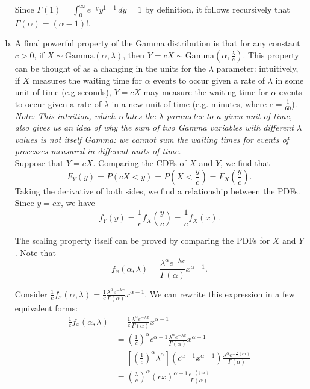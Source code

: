 \begin{enumerate}[a)]
    Since $\Gamma(1) = \int_0^{\infty} e^{-y} y^{1 - 1} \, dy = 1$ by definition, it follows recursively that $\Gamma(\alpha) = (\alpha - 1)!$.

    \item A final powerful property of the Gamma distribution is that for any constant $c > 0$, if $X \sim \mathrm{Gamma}(\alpha, \lambda)$, then
    $Y = cX \sim \mathrm{Gamma}\left(\alpha, \frac{\lambda}{c}\right)$. This property can be thought of as a changing in the units for the $\lambda$ parameter:
    intuitively, if $X$ measures the waiting time for $\alpha$ events to occur given a rate of $\lambda$ in some unit of time (e.g seconds), $Y=cX$ 
    may measure the waiting time for $\alpha$ events to occur given a rate of $\lambda$ in a new unit of time (e.g. minutes, where $c = \frac{1}{60}$). \\

    \textit{Note: This intuition, which relates the $\lambda$ parameter to a given unit of time, also gives us an idea of why
    the sum of two Gamma variables with different $\lambda$ values is not itself Gamma: we cannot sum the waiting times for events of
    processes measured in different units of time.} \\

    Suppose that $Y = cX$. Comparing the CDFs of $X$ and $Y$, we find that
    \[
        F_Y(y) = P(cX < y) = P \left( X < \frac{y}{c} \right) = F_X \left( \frac{y}{c} \right).
    \]
    Taking the derivative of both sides, we find a relationship between the PDFs. Since $y = cx$, we have
    \[
        f_Y(y) = \frac{1}{c} f_X \left( \frac{y}{c} \right) = \frac{1}{c} f_X(x).
    \]

    
    The scaling property itself can be proved by comparing the PDFs for $X$ and $Y$. Note that
    \[
        f_x(\alpha, \lambda) = \frac{\lambda^\alpha e^{-\lambda x}}{\Gamma(\alpha)} x^{\alpha-1}.
    \]

    Consider $\frac{1}{c} f_x(\alpha, \lambda) = \frac{1}{c}\frac{\lambda^\alpha e^{-\lambda x}}{\Gamma(\alpha)} x^{\alpha-1}$. We can rewrite this expression in a few equivalent forms:
    \begin{align*}
        \frac{1}{c} f_x(\alpha, \lambda) &= \frac{1}{c}\frac{\lambda^\alpha e^{-\lambda x}}{\Gamma(\alpha)} x^{\alpha-1} \\
        &= \left(\frac{1}{c}\right)^\alpha c^{\alpha - 1} \frac{\lambda^\alpha e^{-\lambda x}}{\Gamma(\alpha)} x^{\alpha-1} \\
        &= \left[\left(\frac{1}{c}\right)^\alpha \lambda^\alpha\right] \left(c^{\alpha - 1}x^{\alpha-1}\right) \frac{\lambda^\alpha e^{-\frac{\lambda}{x}(cx)}}{\Gamma(\alpha)} \\
        &= \left( \frac{\lambda}{c} \right)^\alpha (cx)^{\alpha-1} \frac{e^{-\frac{\lambda}{c}(cx)}}{\Gamma(\alpha)} 
    \end{align*}


\end{enumerate}
